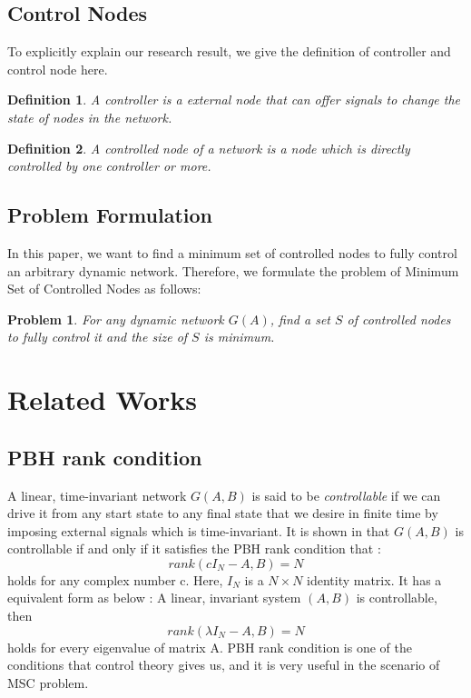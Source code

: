 \documentclass[10pt, conference, letterpaper]{IEEEtran}
\newtheorem{definition}{Definition}[section]
\newtheorem{problem}{Problem}
\begin{document}
\subsection{Control Nodes}
To explicitly explain our research result, we give the definition of controller and control node here.
\begin{definition}
\label{controller}
A controller is a external node that can offer signals to change the state of nodes in the network.
\end{definition}
\begin{definition}
\label{controlNode}
A controlled node of a network is a node which is directly controlled by one controller or more.
\end{definition}

\subsection{Problem Formulation}
In this paper, we want to find a minimum set of controlled nodes to fully control an arbitrary dynamic network. Therefore, we formulate the problem of Minimum Set of Controlled Nodes as follows:
\begin{problem}
For any dynamic network $G(A)$, find a set $S$ of controlled nodes to fully control it and the size of $S$ is minimum.
\end{problem}

\section{Related Works}
\label{sectionRelatedWorks}
\subsection{PBH rank condition}
A linear, time-invariant network $G(A,B)$ is said to be \emph{controllable} if we can drive it from any start state to any final state that we desire in finite time by imposing external signals which is time-invariant. It is shown in \cite{Hautus1969Controllability} that $G(A,B)$ is controllable if and only if it satisfies the PBH rank condition that :
\begin{equation*}
rank(cI_N - A, B) = N
\end{equation*}
holds for any complex number c. Here, $ I_N$ is a $N \times N $ identity matrix. It has a equivalent form as below :
A linear, invariant system $ (A,B) $ is controllable, then
\begin{equation*}
rank(\lambda I_N - A, B) = N
\end{equation*}
holds for every eigenvalue of matrix A.
PBH rank condition is one of the conditions that control theory gives us, and it is very useful in the scenario of MSC problem.
\end{document}
